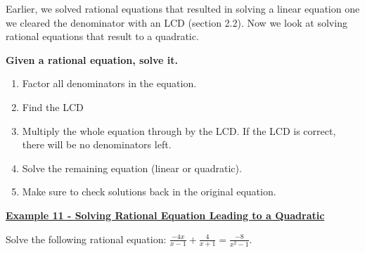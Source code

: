 \documentclass[12pt]{book}
\newcommand{\D}{\displaystyle}
\begin{document}
Earlier, we solved rational equations that resulted in solving a linear equation one we cleared the denominator with an LCD (section 2.2). Now we look at solving rational equations that result to a quadratic.

\begin{boxR}
    \textbf{Given a rational equation, solve it. }
    \vspace{1mm}
    \hline
    \vspace{2mm}
    \begin{enumerate}
        \item Factor all denominators in the equation.
        \item Find the LCD
        \item Multiply the whole equation through by the LCD. If the LCD is correct, there will be no denominators left. 
        \item Solve the remaining equation (linear or quadratic).
        \item Make sure to check solutions back in the original equation.
    \end{enumerate}
\end{boxR}

\underline{\textbf{Example 11 - Solving Rational Equation Leading to a Quadratic}}
\vspace{3mm}

Solve the following rational equation: $\D \frac{-4x}{x-1} + \frac{4}{x+1} = \frac{-8}{x^2-1}$.
\end{document}
